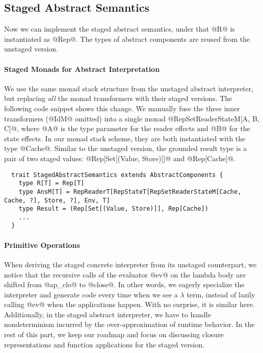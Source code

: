 \subsection{Staged Abstract Semantics}

Now we can implement the staged abstract semantics, under that @R@ is instantiated as
@Rep@. The types of abstract components are reused from the unstaged version.

\paragraph{Staged Monads for Abstract Interpretation}
We use the same monad stack structure from the unstaged abstract interpreter,
but replacing \textit{all} the monad transformers with their staged versions. The
following code snippet shows this change. We manually fuse the three inner
transformers (@IdM@ omitted) into a single monad @RepSetReaderStateM[A, B, C]@,
where @A@ is the type parameter for the reader effects and @B@ for the state effects.
In our monad stack scheme, they are both instantiated with the type @Cache@. 
Similar to the unstaged version, the grounded result type is a pair of two
staged values: @Rep[Set[(Value, Store)]]@ and @Rep[Cache]@.
\begin{lstlisting}
  trait StagedAbstractSemantics extends AbstractComponents {
    type R[T] = Rep[T]
    type AnsM[T] = RepReaderT[RepStateT[RepSetReaderStateM[Cache, Cache, ?], Store, ?], Env, T]
    type Result = (Rep[Set[(Value, Store)]], Rep[Cache])
    ...
  }
\end{lstlisting}

\iffalse
Since our monad stack is uniformly using staged data, the staged @SetT@ now
stores a staged value of type @Rep[Set[A]]@, inside of another staged monad @M@.
\begin{lstlisting}
  case class SetT[M[_]: RepMonad, A](run: M[Set[A]]) {
    def flatMap[B: Manifest](f: Rep[A] => SetT[M, B]): SetT[M, B] = ...
  }
\end{lstlisting}
\fi

\paragraph{Primitive Operations} 
When deriving the staged concrete interpreter from its unstaged counterpart, we
notice that the recursive calls of the evaluator @ev@ on the lambda body are shifted from
@ap_clo@ to @close@. In other words, we eagerly specialize the interpreter and
generate code every time when we see a $\lambda$ term, instead of lazily
calling @ev@ when the applications happen.  With no surprise, it is similar
here. Additionally, in the staged abstract interpreter, we have to handle
nondeterminism incurred by the over-approximation of runtime behavior.  In the
rest of this part, we keep our roadmap and focus on discussing closure
representations and function applications for the staged version.

